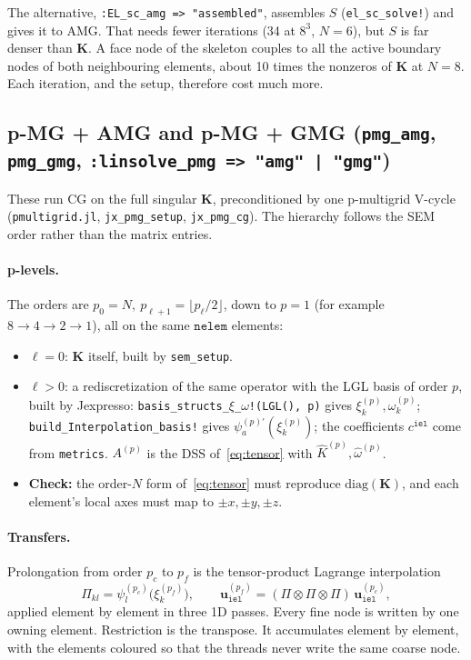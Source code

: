 \documentclass[11pt]{article}
\newcommand{\nelem}{\mathtt{nelem}}
\newcommand{\iel}{\mathtt{iel}}
\newcommand{\K}{\mathbf{K}}
\newcommand{\uu}{\mathbf{u}}
\newcommand{\Khat}{\widehat{K}}
\newcommand{\What}{\widehat{\omega}}
\newcommand{\code}[1]{\texttt{#1}}
\begin{document}
The alternative, \code{:EL\_sc\_amg => "assembled"}, assembles $S$ (\code{el\_sc\_solve!}) and gives it to AMG. That
needs fewer iterations (34 at $8^3$, $N=6$), but $S$ is far denser than $\K$. A face node of the skeleton couples
to all the active boundary nodes of both neighbouring elements, about 10 times the nonzeros of $\K$ at
$N=8$. Each iteration, and the setup, therefore cost much more.

\subsection{p-MG + AMG and p-MG + GMG (\code{pmg\_amg}, \code{pmg\_gmg}, \code{:linsolve\_pmg => "amg" | "gmg"})}
These run CG on the full singular $\K$, preconditioned by one p-multigrid V-cycle (\code{pmultigrid.jl},
\code{jx\_pmg\_setup}, \code{jx\_pmg\_cg}). The hierarchy follows the SEM order rather than the matrix entries.

\paragraph{p-levels.} The orders are $p_0=N,\ p_{\ell+1}=\lfloor p_\ell/2\rfloor$, down to $p=1$ (for example $8\to4\to2\to1$), all on
the same $\nelem$ elements:
\begin{itemize}
  \item $\ell=0$: $\K$ itself, built by \code{sem\_setup}.
  \item $\ell>0$: a rediscretization of the same operator with the LGL basis of order $p$, built by Jexpresso:
        \code{basis\_structs\_$\xi$\_$\omega$!(LGL(), p)} gives $\xi^{(p)}_k,\omega^{(p)}_k$;
        \code{build\_Interpolation\_basis!} gives $\psi^{(p)\prime}_a(\xi^{(p)}_k)$; the coefficients $c^{\iel}$
        come from \code{metrics}. $A^{(p)}$ is the DSS of~\eqref{eq:tensor} with $\Khat^{(p)},\What^{(p)}$.
  \item \textbf{Check:} the order-$N$ form of~\eqref{eq:tensor} must reproduce $\mathrm{diag}(\K)$, and each element's
        local axes must map to $\pm x,\pm y,\pm z$.
\end{itemize}

\paragraph{Transfers.} Prolongation from order $p_c$ to $p_f$ is the tensor-product Lagrange interpolation
\begin{equation}
  \Pi_{kl} = \psi^{(p_c)}_{l}\big(\xi^{(p_f)}_{k}\big),\qquad
  \uu^{(p_f)}_{\iel} = (\Pi\otimes\Pi\otimes\Pi)\,\uu^{(p_c)}_{\iel},
  \label{eq:transfer}
\end{equation}
applied element by element in three 1D passes. Every fine node is written by one owning element. Restriction is
the transpose. It accumulates element by element, with the elements coloured so that the threads never
write the same coarse node.
\end{document}
